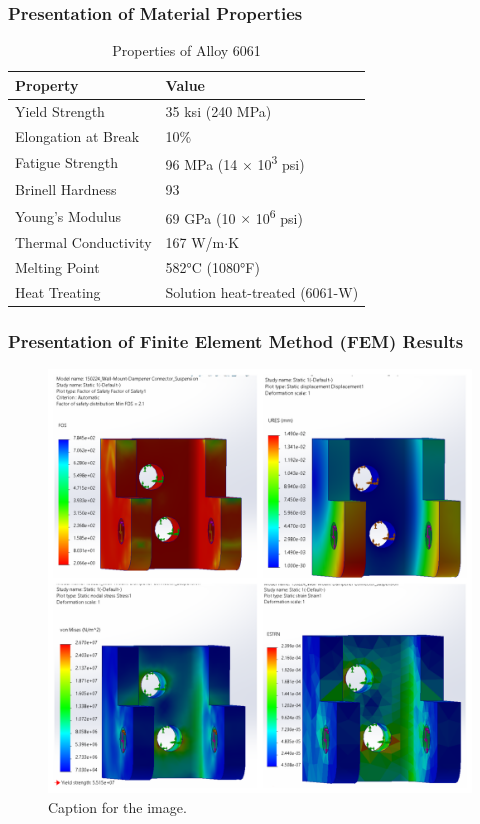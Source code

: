 \subsubsection{Presentation of Material Properties}
\begin{table}[H]
\centering
\caption{Properties of Alloy 6061}
\begin{tabular}{@{}ll@{}}
\toprule
\textbf{Property} & \textbf{Value} \\
\midrule
Yield Strength & 35 ksi (240 MPa) \\
Elongation at Break & 10\% \\
Fatigue Strength & 96 MPa (14 $\times$ 10\textsuperscript{3} psi) \\
Brinell Hardness & 93 \\
Young’s Modulus & 69 GPa (10 $\times$ 10\textsuperscript{6} psi) \\
Thermal Conductivity & 167 W/m$\cdot$K \\
Melting Point & 582°C (1080°F) \\
Heat Treating & Solution heat-treated (6061-W) \\
\bottomrule
\end{tabular}
\end{table}

\subsubsection{Presentation of Finite Element Method (FEM) Results}
\begin{figure}[H]
  \centering
  \includegraphics[width=\linewidth]{texfiles/mech/eimg/suspension/Mounting FEM results.png}
  \caption{Caption for the image.}
  \label{fig:image1}
\end{figure}


